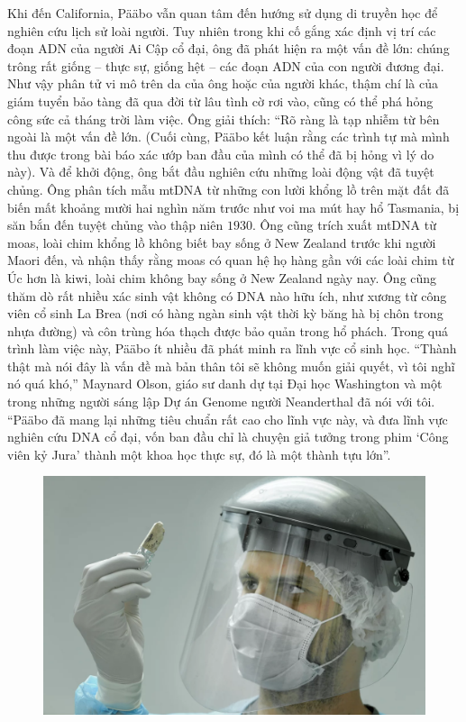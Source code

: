 \begin{multicols}{2}
	\vskip 0.2cm
	\vskip 0.2cm
	Khi đến California, Pääbo vẫn quan tâm đến hướng sử dụng di truyền học để nghiên cứu lịch sử loài người. Tuy nhiên trong khi cố gắng xác định vị trí các đoạn ADN của người Ai Cập cổ đại, ông đã phát hiện ra một vấn đề lớn: chúng trông rất giống -- thực sự, giống hệt -- các đoạn ADN của con người đương đại. Như vậy phân tử vi mô trên da của ông hoặc của người khác, thậm chí là của giám tuyển bảo tàng đã qua đời từ lâu tình cờ rơi vào, cũng có thể phá hỏng công sức cả tháng trời làm việc.
	\vskip 0.1cm
	Ông giải thích: “Rõ ràng là tạp nhiễm từ bên ngoài là một vấn đề lớn. (Cuối cùng, Pääbo kết luận rằng các trình tự mà mình thu được trong bài báo xác ướp ban đầu của mình có thể đã bị hỏng vì lý do này). Và để khởi động, ông bắt đầu nghiên cứu những loài động vật đã tuyệt chủng. Ông phân tích mẫu mtDNA từ những con lười khổng lồ trên mặt đất đã biến mất khoảng mười hai nghìn năm trước như voi ma mút hay hổ Tasmania, bị săn bắn đến tuyệt chủng vào thập niên $1930$. Ông cũng trích xuất mtDNA từ moas, loài chim khổng lồ không biết bay sống ở New Zealand trước khi người Maori đến, và nhận thấy rằng moas có quan hệ họ hàng gần với các loài chim từ Úc hơn là kiwi, loài chim không bay sống ở New Zealand ngày nay. Ông cũng thăm dò rất nhiều xác sinh vật không có DNA nào hữu ích, như xương từ công viên cổ sinh La Brea (nơi có hàng ngàn sinh vật thời kỳ băng hà bị chôn trong nhựa đường) và côn trùng hóa thạch được bảo quản trong hổ phách. Trong quá trình làm việc này, Pääbo ít nhiều đã phát minh ra lĩnh vực cổ sinh học.
	\vskip 0.1cm
	“Thành thật mà nói đây là vấn đề mà bản thân tôi sẽ không muốn giải quyết, vì tôi nghĩ nó quá khó,” Maynard Olson, giáo sư danh dự tại Đại học Washington và một trong những người sáng lập Dự án Genome người Neanderthal đã nói với tôi. “Pääbo đã mang lại những tiêu chuẩn rất cao cho lĩnh vực này, và đưa lĩnh vực nghiên cứu DNA cổ đại, vốn ban đầu chỉ là chuyện giả tưởng trong phim ‘Công viên kỷ Jura’ thành một khoa học thực sự, đó là một thành tựu lớn”.
	\begin{figure}[H]
		\vspace*{-5pt}
		\centering
		\captionsetup{labelformat= empty, justification=centering}
		\includegraphics[width= 1\linewidth]{3}

\end{figure}
\end{multicols}
